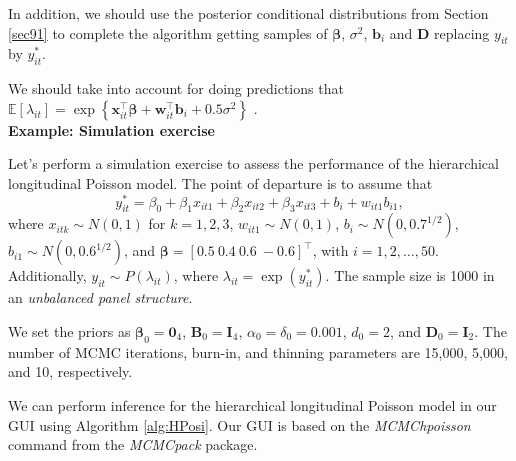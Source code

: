 In addition, we should use the posterior conditional distributions from Section \ref{sec91} to complete the algorithm getting samples of $\bm{\beta}$, $\sigma^2$, $\bm{b}_i$ and $\bm{D}$ replacing $y_{it}$ by ${y}_{it}^*$.

We should take into account for doing predictions that $\mathbb{E}[{\lambda}_{it}]=\exp\left\{\bm{x}_{it}^{\top}\bm{\beta}+\bm{w}_{it}^{\top}\bm{b}_i+0.5\sigma^2\right\}$ \cite[~pag. 137]{diggle2002analysis}.\\

\textbf{Example: Simulation exercise}

Let's perform a simulation exercise to assess the performance of the hierarchical longitudinal Poisson model. The point of departure is to assume that 
\[
y_{it}^* = \beta_0 + \beta_1 x_{it1} + \beta_2 x_{it2} + \beta_3 x_{it3} + b_i + w_{it1} b_{i1},
\]
where $x_{itk} \sim N(0,1)$ for $k = 1, 2, 3$, $w_{it1} \sim N(0,1)$, $b_i \sim N(0, 0.7^{1/2})$, $b_{i1} \sim N(0, 0.6^{1/2})$, and $\bm{\beta} = [0.5 \ 0.4 \ 0.6 \ -0.6]^{\top}$, with $i = 1, 2, \dots, 50$. Additionally, $y_{it} \sim P(\lambda_{it})$, where $\lambda_{it} = \exp(y_{it}^*)$. The sample size is 1000 in an \textit{unbalanced panel structure}.

We set the priors as $\bm{\beta}_0 = \bm{0}_4$, $\bm{B}_0 = \bm{I}_4$, $\alpha_0 = \delta_0 = 0.001$, $d_0 = 2$, and $\bm{D}_0 = \bm{I}_2$. The number of MCMC iterations, burn-in, and thinning parameters are 15,000, 5,000, and 10, respectively.

We can perform inference for the hierarchical longitudinal Poisson model in our GUI using Algorithm \ref{alg:HPosi}. Our GUI is based on the \textit{MCMChpoisson} command from the \textit{MCMCpack} package.

